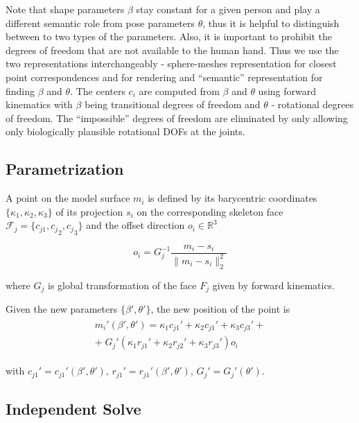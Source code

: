 \documentclass[10pt,twocolumn,letterpaper]{article}
\begin{document}
Note that shape parameters $\beta$ stay constant for a given person and play a different semantic role from pose parameters $\theta$, thus it is helpful to distinguish between to two types of the parameters. Also, it is important to prohibit the degrees of freedom that are not available to the human hand. Thus we use the two representations interchangeably - sphere-meshes representation for closest point correspondences and for rendering and ``semantic'' representation for finding $\beta$ and $\theta$.
The centers $c_i$ are computed from $\beta$ and $\theta$ using forward kinematics with $\beta$ being transitional degrees of freedom and $\theta$ - rotational degrees of freedom. The ``impossible'' degrees of freedom are eliminated by only allowing only biologically plausible rotational DOFs at the joints.

\subsection {Parametrization}

A point on the model surface $m_i$ is defined by its barycentric coordinates $\{\kappa_1, \kappa_2, \kappa_3\} $ of its projection $s_i$ on the corresponding skeleton face $\mathcal{F}_j = \{c_{j1}, {c_j}_2, {c_j}_3\}$ and the offset direction $o_i \in \mathbb{R}^3$

\begin{equation}
o_i = G_j^{-1} \frac{m_i - s_i} {\| m_i - s_i \|_2^2}
\end{equation}

where $G_j$ is global transformation of the face $F_j$ given by forward kinematics.

Given the new parameters $\{ \beta', \theta' \}$, the new position of the point is
\begin{align}
\begin{split}
m_i'(\beta', \theta') = \kappa_1 c_{j1}' + \kappa_2 c_{j1}' + \kappa_3 c_{j3}' + \\
 + \;  G_j'(\kappa_1 r_{j1}' + \kappa_2 r_{j2}' + \kappa_3 r_{j3}') o_i
\end{split}
\end{align}

with $c_{j1}' = c_{j1}'(\beta', \theta')$,  $r_{j1}' = r_{j1}'(\beta', \theta')$, $G_j' =G_j'(\theta')$.

\subsection {Independent Solve} \label{sec:independent-solve}
\end{document}
